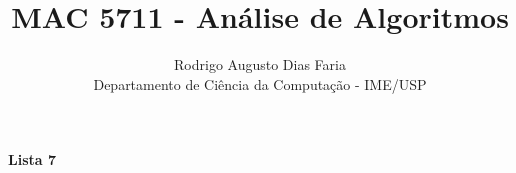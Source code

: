 \documentclass[12pt]{article}
\begin{document}
\title{MAC 5711 - Análise de Algoritmos}
\author{Rodrigo Augusto Dias Faria\\
Departamento de Ciência da Computação - IME/USP}

\maketitle

\begin{comment}
\begin{center}
\textbf{\large{Lista 1}}
\end{center}




\clearpage
\begin{center}
\textbf{\large{Lista 2}}
\end{center}



\clearpage
\begin{center}
\textbf{\large{Lista 3}}
\end{center}





\clearpage

\begin{center}
\textbf{\large{Lista 4}}
\end{center}






\clearpage

\begin{center}
\textbf{\large{Lista 5}}
\end{center}


















\clearpage

\begin{center}
\textbf{\large{Lista 6}}
\end{center}

















\clearpage
\end{comment}

\begin{center}
\textbf{\large{Lista 7}}
\end{center}
















\clearpage
\end{document}
